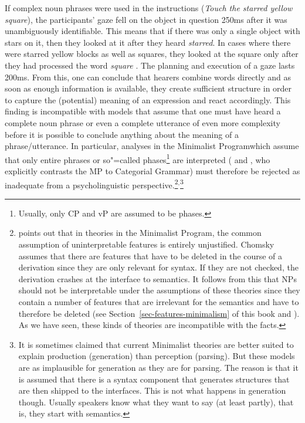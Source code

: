 If complex noun phrases were used in the instructions (\emph{Touch the starred yellow
  square}), the participants' gaze fell on the object in question 250ms after it was unambiguously identifiable.
  This means that if there was only a single object with stars on it, then they looked at it after they heard
  \emph{starred}. In cases where there were starred yellow blocks as well as squares, they looked at the square
  only after they had processed the word \emph{square} \citep[]{TSKES95a}.
The planning and execution of a gaze lasts 200ms. From this, one can conclude that hearers combine words directly
and as soon as enough information is available, they create sufficient structure in order to capture
the (potential) meaning of an expression and react accordingly.
This finding is incompatible with models that assume that one must have heard a complete noun phrase or even a complete utterance
of even more complexity before it is possible to conclude anything about the meaning of a phrase/utterance. 
In particular, analyses in the Minimalist Program\indexmp which assume that only entire phrases or so"=called phases\footnote{
     Usually, only CP and vP are assumed to be phases.
}
are interpreted ( and , who explicitly contrasts the
MP to Categorial Grammar\indexcg) must therefore be rejected as inadequate from a psycholinguistic perspective.\footnote{
\citet[--730]{Sternefeld2006a-u} points out that in theories in the Minimalist Program, the common assumption of uninterpretable
features is entirely unjustified. Chomsky assumes that there are features that have to be deleted in the course of a derivation
since they are only relevant for syntax. If they are not checked, the derivation crashes at the interface to semantics.
It follows from this that NPs should not be interpretable under the assumptions of these theories since they contain a number of features
that are irrelevant for the semantics and have to therefore be deleted (see
Section~\ref{sec-features-minimalism} of this book and \citealp{Richards2015a}).
As we have seen, these kinds of theories are incompatible with the facts.
}$^,$\footnote{
  It is sometimes claimed that current Minimalist theories are better suited to explain production (generation)
  than perception (parsing). But these models are as implausible for generation as they are for parsing. The
  reason is that it is assumed that there is a syntax component that generates structures that are
  then shipped to the interfaces. This is not what happens in generation though. Usually speakers
  know what they want to say (at least partly), that is, they start with semantics.
}

